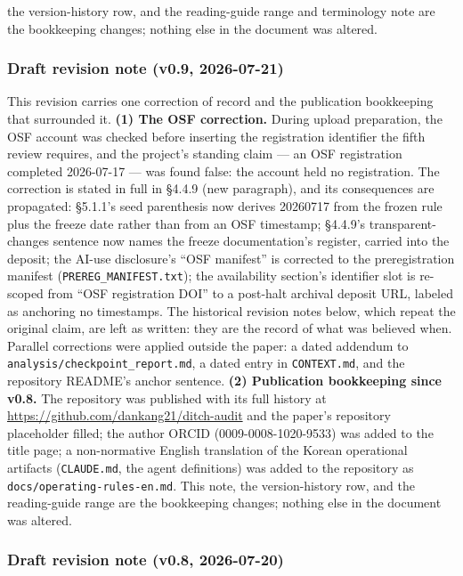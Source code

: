 the version-history row, and the reading-guide range and terminology note are the bookkeeping changes; nothing else in the document was altered.

\subsubsection{Draft revision note (v0.9, 2026-07-21)}\label{draft-revision-note-v0.9-2026-07-21}

This revision carries one correction of record and the publication bookkeeping that surrounded it. \textbf{(1) The OSF correction.} During upload preparation, the OSF account was checked before inserting the registration identifier the fifth review requires, and the project's standing claim --- an OSF registration completed 2026-07-17 --- was found false: the account held no registration. The correction is stated in full in \S{}4.4.9 (new paragraph), and its consequences are propagated: \S{}5.1.1's seed parenthesis now derives 20260717 from the frozen rule plus the freeze date rather than from an OSF timestamp; \S{}4.4.9's transparent-changes sentence now names the freeze documentation's register, carried into the deposit; the AI-use disclosure's ``OSF manifest'' is corrected to the preregistration manifest (\texttt{PREREG\_MANIFEST.txt}); the availability section's identifier slot is re-scoped from ``OSF registration DOI'' to a post-halt archival deposit URL, labeled as anchoring no timestamps. The historical revision notes below, which repeat the original claim, are left as written: they are the record of what was believed when. Parallel corrections were applied outside the paper: a dated addendum to \texttt{analysis/checkpoint\_report.md}, a dated entry in \texttt{CONTEXT.md}, and the repository README's anchor sentence. \textbf{(2) Publication bookkeeping since v0.8.} The repository was published with its full history at \url{https://github.com/dankang21/ditch-audit} and the paper's repository placeholder filled; the author ORCID (0009-0008-1020-9533) was added to the title page; a non-normative English translation of the Korean operational artifacts (\texttt{CLAUDE.md}, the agent definitions) was added to the repository as \texttt{docs/operating-rules-en.md}. This note, the version-history row, and the reading-guide range are the bookkeeping changes; nothing else in the document was altered.

\subsubsection{Draft revision note (v0.8, 2026-07-20)}\label{draft-revision-note-v0.8-2026-07-20}

